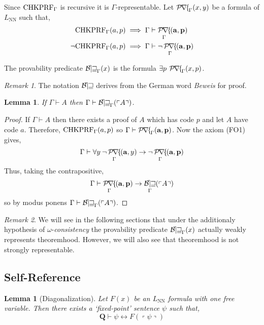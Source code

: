 \documentclass[12pt, leqno]{article}
\renewcommand{\bf}[1]{\mathbf{#1}}
\newcommand{\proves}{\vdash}
\newcommand{\uq}[1]{\forall{#1} \:}
\newcommand{\eq}[1]{\exists{#1} \:}
\newenvironment{definition}[1][Definition:]{\begin{trivlist}
\item[\hskip \labelsep {\bfseries #1}]}{\end{trivlist}}
\theoremstyle{theorem}
\newtheorem{lemma}[theorem]{Lemma}
\theoremstyle{definition}
\theoremstyle{definition}
\theoremstyle{remark}
\theoremstyle{definition}
\theoremstyle{remark}
\newtheorem{remark}{Remark}[subsection]
\DeclareMathOperator{\Prf}{\mathcal{P\mkern-2mu r\mkern-2.5mu f\mkern-2mu}}
\DeclareMathOperator{\Bew}{\mathcal{B\mkern-2.0mu e\mkern-2.0mu w\mkern-1mu}}
\newcommand{\Gterm}[1]{\left\ulcorner #1 \right\urcorner}
\newcommand{\Thm}[1]{\Bew_{\Gamma}(\Gterm{#1})}
\begin{document}
\begin{definition}
Since $\mathrm{CHKPRF}_{\Gamma}$ is recursive it is $\Gamma$-representable. Let $\Prf_{\Gamma}(x,y)$ be a formula of $L_{\text{NN}}$ such that,
\begin{align*}
\CHKPRF_{\Gamma}(a,p) & \implies \Gamma \proves \Prf_{\Gamma}(\bf{a}, \bf{p})
\\
\neg \CHKPRF_{\Gamma}(a,p) & \implies \Gamma \proves \neg \Prf_{\Gamma}(\bf{a}, \bf{p})
\end{align*}
\end{definition}

\begin{definition}
The provability predicate $\Bew_\Gamma(x)$ is the formula $\eq{p}\Prf_{\Gamma}(x, p)$.
\end{definition}

\begin{remark}
The notation $\Bew$ derives from the German word \textit{Beweis} for proof. 
\end{remark}

\begin{lemma}
If $\Gamma \proves A$ then $\Gamma \proves \Thm{A}$.
\end{lemma}

\begin{proof}
If $\Gamma \proves A$ then there exists a proof of $A$ which has code $p$ and let $A$ have code $a$. Therefore, $\mathrm{CHKPRF}_{\Gamma}(a,p)$ so $\Gamma \proves \Prf_{\Gamma}(\bf{a}, \bf{p})$. Now the axiom (FO1) gives, 
\[ \Gamma \proves \uq{y} \neg \Prf_{\Gamma}(\bf{a}, y) \to \neg \Prf_{\Gamma}(\bf{a}, \bf{p}) \] 
Thus, taking the contrapositive, 
\[ \Gamma \proves \Prf_{\Gamma}(\bf{a}, \bf{p}) \to \Thm{A} \]
so by modus ponens $\Gamma \proves \Thm{A}$. 
\end{proof}

\begin{remark}
We will see in the following sections that under the additionaly hypothesis of $\omega$-\textit{consistency} the provability predicate $\Bew_\Gamma(x)$ actually weakly represents theoremhood. However, we will also see that theoremhood is not strongly representable.
\end{remark}

\subsection{Self-Reference}

\begin{lemma}[Diagonalization]
Let $F(x)$ be an $L_{\mathrm{NN}}$ formula with one free variable. Then there exists a `fixed-point' sentence $\psi$ such that,
\[ \bf{Q} \proves \psi \leftrightarrow F(\Gterm{\psi}) \]
\end{lemma}
\end{document}
